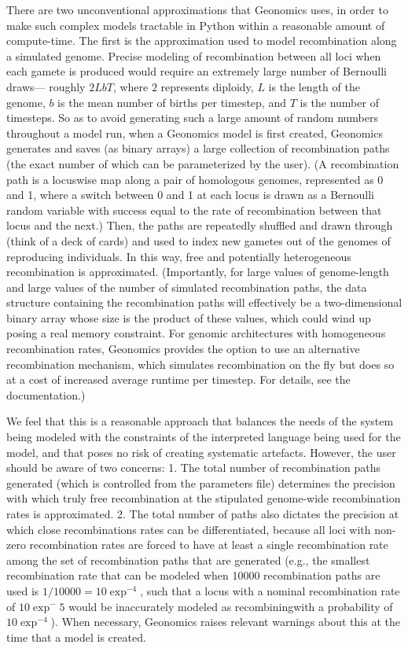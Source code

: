 ﻿\documentclass{article}
\begin{document}
There are two unconventional approximations that Geonomics uses,
in order to make such complex models tractable in Python within a reasonable amount of compute-time.
The first is the approximation used to model recombination along a simulated genome.
Precise modeling of recombination between all loci when each gamete is produced
would require an extremely large number of Bernoulli draws---
roughly $2LbT$, where $2$ represents diploidy, $L$ is the length of the genome,
$b$ is the mean number of births per timestep, and $T$ is the number of timesteps.
So as to avoid generating such a large amount of random numbers throughout a model run,
when a Geonomics model is first created, Geonomics generates and saves
(as binary arrays) a large collection of recombination paths (the exact number of which can
be parameterized by the user).
(A recombination path is a locuswise map along a pair of homologous genomes,
represented as 0 and 1, where a switch between 0 and 1 at each locus is drawn as a Bernoulli
random variable with success equal to the rate of recombination between that locus and the next.)
Then, the paths are repeatedly shuffled and drawn through (think of a deck of cards)
and used to index new gametes out of the genomes of reproducing individuals.
In this way, free and potentially heterogeneous recombination is approximated.
(Importantly, for large values of genome-length and large values of
the number of simulated recombination paths, the data structure
containing the recombination paths will effectively be a two-dimensional
binary array whose size is the product of these values,
which could wind up posing a real memory constraint.
For genomic architectures with homogeneous recombination rates,
Geonomics provides the option to use an alternative recombination mechanism,
which simulates recombination on the fly but does so at a cost of increased
average runtime per timestep. For details, see the documentation.)

We feel that this is a reasonable approach that balances the needs of the system being modeled
with the constraints of the interpreted language being used for the model,
and that poses no risk of creating systematic artefacts.
However, the user should be aware of two concerns:
1. The total number of recombination paths generated
(which is controlled from the parameters file)
determines the precision with which truly 
free recombination at the stipulated genome-wide recombination rates is approximated.
2. The total number of paths also dictates the precision at which close recombinations
rates can be differentiated, because all loci with non-zero recombination rates are forced to
have at least a single recombination rate among the set of recombination paths that are generated
(e.g., the smallest recombination rate that can be modeled when 10000 recombination paths
are used is $1/10000=10\exp^{-4}$, such that a locus with a nominal recombination rate of 
$10\exp^-5$ would be inaccurately modeled as recombiningwith a probability of $10\exp^{-4}$). 
When necessary, Geonomics raises relevant warnings about this at the time that a model is created.
\end{document}
